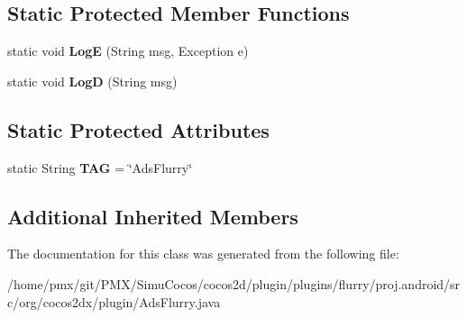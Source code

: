 \subsection*{Static Protected Member Functions}
\begin{DoxyCompactItemize}
\item 
\mbox{\label{classorg_1_1cocos2dx_1_1plugin_1_1AdsFlurry_a2f6caf8977b168d26b91ed0adf5be95b}} 
static void {\bfseries LogE} (String msg, Exception e)
\item 
\mbox{\label{classorg_1_1cocos2dx_1_1plugin_1_1AdsFlurry_a3b7cf9ab325305eef7929f4550e88d17}} 
static void {\bfseries LogD} (String msg)
\end{DoxyCompactItemize}
\subsection*{Static Protected Attributes}
\begin{DoxyCompactItemize}
\item 
\mbox{\label{classorg_1_1cocos2dx_1_1plugin_1_1AdsFlurry_ae83201a405871263bd311faab8572c80}} 
static String {\bfseries T\+AG} = \char`\"{}Ads\+Flurry\char`\"{}
\end{DoxyCompactItemize}
\subsection*{Additional Inherited Members}


The documentation for this class was generated from the following file\+:\begin{DoxyCompactItemize}
\item 
/home/pmx/git/\+P\+M\+X/\+Simu\+Cocos/cocos2d/plugin/plugins/flurry/proj.\+android/src/org/cocos2dx/plugin/Ads\+Flurry.\+java\end{DoxyCompactItemize}
